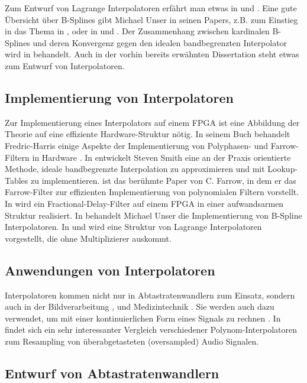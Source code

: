 \documentclass[11pt]{article}
\begin{document}
Zum Entwurf von Lagrange Interpolatoren erfährt man etwas in \cite{Schafer1973} und \cite{Ye2003}. Eine gute Übersicht über 
B-Splines gibt Michael Unser in seinen Papers, z.B. zum Einstieg in das Thema in \cite{Unser1999}, oder in \cite{Unser1993c} und \cite{Unser1993b}. Der Zusammenhang
zwischen kardinalen B-Splines und deren Konvergenz gegen den idealen bandbegrenzten Interpolator wird in \cite{Aldroubi1992} behandelt. 
Auch in der vorhin bereits erwähnten Dissertation \cite{Evangelista2001} steht etwas zum Entwurf von Interpolatoren.

\subsection*{Implementierung von Interpolatoren}

Zur Implementierung eines Interpolators auf einem FPGA ist eine Abbildung der Theorie auf eine effiziente Hardware-Struktur nötig. In seinem Buch behandelt Fredric-Harris
einige Aspekte der Implementierung von Polyphasen- und Farrow-Filtern in Hardware \cite{Harris2004}.
In \cite{Smith1993} entwickelt Steven Smith eine an der Praxis orientierte Methode, ideale bandbegrenzte Interpolation zu approximieren und mit 
Lookup-Tables zu implementieren. \cite{Farrow1988} ist das berühmte Paper von C. Farrow, in dem er das Farrow-Filter zur effizienten Implementierung
von polynomialen Filtern vorstellt. In \cite{Nit2009} wird ein Fractional-Delay-Filter auf einem FPGA in einer aufwandsarmen Struktur realisiert. 
In \cite{Unser1993b} behandelt Michael Unser die Implementierung von B-Spline Interpolatoren. In \cite{Francesconi1993} und \cite{Francesconi1993a}
wird eine Struktur von Lagrange Interpolatoren vorgestellt, die ohne Multiplizierer auskommt.

\subsection*{Anwendungen von Interpolatoren}

Interpolatoren kommen nicht nur in Abtastratenwandlern zum Einsatz, sondern auch in der Bildverarbeitung \cite{Unser1995}, 
und Medizintechnik \cite{Lehmann2001}. Sie werden auch dazu verwendet, um mit einer kontinuierlichen Form eines Signals zu rechnen
 \cite{Babic}. In \cite{Niemitalo2001} findet sich ein sehr interessanter Vergleich verschiedener Polynom-Interpolatoren zum Resampling von überabgetasteten (oversampled)
Audio Signalen.  

\subsection*{Entwurf von Abtastratenwandlern}
\end{document}
